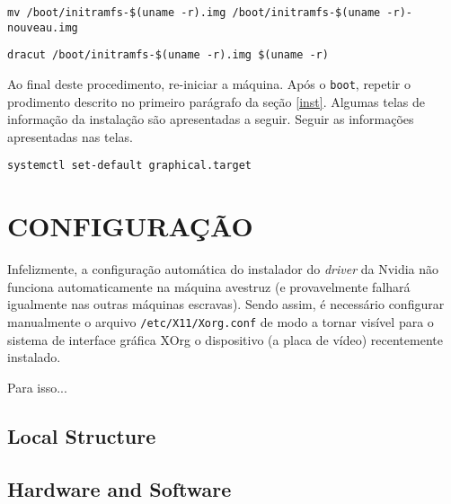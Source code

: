 \documentclass[twoside,a4paper,12pt,english]{inac17}
\begin{document}
\texttt{mv /boot/initramfs-\$(uname -r).img /boot/initramfs-\$(uname -r)-nouveau.img}

\texttt{dracut /boot/initramfs-\$(uname -r).img \$(uname -r)}

Ao final deste procedimento, re-iniciar a máquina. Após o \texttt{boot}, 
repetir o prodimento descrito no primeiro parágrafo da seção \ref{inst}. 
Algumas telas de informação da instalação são apresentadas a seguir. Seguir 
as informações apresentadas nas telas.


\texttt{systemctl set-default graphical.target}




\section{CONFIGURAÇÃO}

Infelizmente, a configuração automática do instalador do \textit{driver} da Nvidia 
não funciona automaticamente na máquina avestruz (e provavelmente falhará igualmente 
nas outras máquinas escravas). Sendo assim, é necessário configurar manualmente 
o arquivo \texttt{/etc/X11/Xorg.conf} de modo a tornar visível para o sistema 
de interface gráfica XOrg o dispositivo (a placa de vídeo) recentemente instalado.

Para isso...

\subsection{Local Structure}


\subsection{Hardware and Software}



\end{document}
